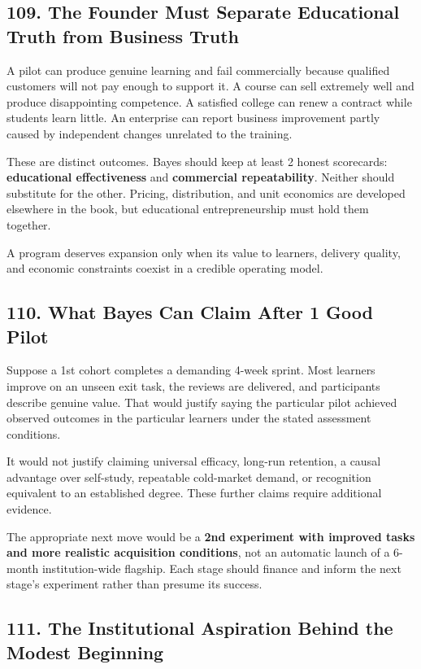 \subsection*{109. The Founder Must Separate Educational Truth from Business Truth}

A pilot can produce genuine learning and fail commercially because qualified customers will not pay enough to support it. A course can sell extremely well and produce disappointing competence. A satisfied college can renew a contract while students learn little. An enterprise can report business improvement partly caused by independent changes unrelated to the training.

These are distinct outcomes. Bayes should keep at least 2 honest scorecards: \textbf{educational effectiveness} and \textbf{commercial repeatability}. Neither should substitute for the other. Pricing, distribution, and unit economics are developed elsewhere in the book, but educational entrepreneurship must hold them together.

A program deserves expansion only when its value to learners, delivery quality, and economic constraints coexist in a credible operating model.

\subsection*{110. What Bayes Can Claim After 1 Good Pilot}

Suppose a 1st cohort completes a demanding 4-week sprint. Most learners improve on an unseen exit task, the reviews are delivered, and participants describe genuine value. That would justify saying the particular pilot achieved observed outcomes in the particular learners under the stated assessment conditions.

It would not justify claiming universal efficacy, long-run retention, a causal advantage over self-study, repeatable cold-market demand, or recognition equivalent to an established degree. These further claims require additional evidence.

The appropriate next move would be a \textbf{2nd experiment with improved tasks and more realistic acquisition conditions}, not an automatic launch of a 6-month institution-wide flagship. Each stage should finance and inform the next stage's experiment rather than presume its success.

\subsection*{111. The Institutional Aspiration Behind the Modest Beginning}

